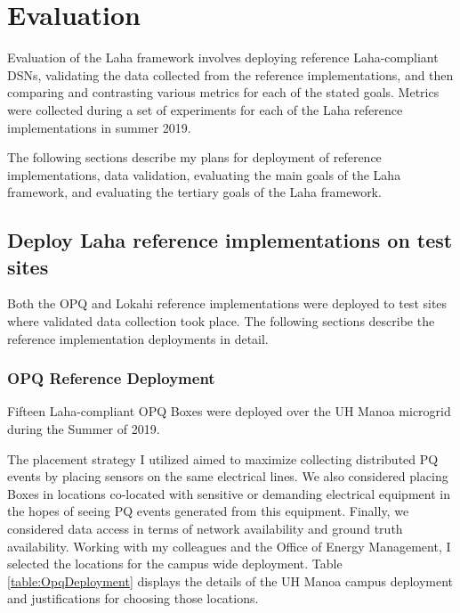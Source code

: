 \chapter{Evaluation}
Evaluation of the Laha framework involves deploying reference Laha-compliant DSNs, validating the data collected from the reference implementations, and then comparing and contrasting various metrics for each of the stated goals. Metrics were collected during a set of experiments for each of the Laha reference implementations in summer 2019. 

The following sections describe my plans for deployment of reference implementations, data validation, evaluating the main goals of the Laha framework, and evaluating the tertiary goals of the Laha framework.

\section{Deploy Laha reference implementations on test sites}
Both the OPQ and Lokahi reference implementations were deployed to test sites where validated data collection took place. The following sections describe the reference implementation deployments in detail.

\subsection{OPQ Reference Deployment}
Fifteen Laha-compliant OPQ Boxes were deployed over the UH Manoa microgrid during the Summer of 2019. 

The placement strategy I utilized aimed to maximize collecting distributed PQ events by placing sensors on the same electrical lines. We also considered placing Boxes in locations co-located with sensitive or demanding electrical equipment in the hopes of seeing PQ events generated from this equipment. Finally, we considered data access in terms of network availability and ground truth availability. Working with my colleagues and the Office of Energy Management, I selected the locations for the campus wide deployment. Table \ref{table:OpqDeployment} displays the details of the UH Manoa campus deployment and justifications for choosing those locations.

